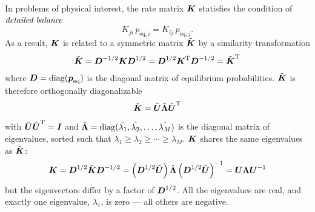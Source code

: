 In problems of physical interest, the rate matrix ${\mbox{\boldmath{$K$}}}$ statisfies the condition of $\emph{detailed balance}$
\begin{equation}
K_{ji} \, p_{\mathrm{eq},i}  = K_{ij} \, p_{\mathrm{eq},j} .
\end{equation}
As a result, ${\mbox{\boldmath{$K$}}}$ is related to a symmetric matrix $\tilde{{\mbox{\boldmath{$K$}}}}$ by a similarity transformation
\begin{eqnarray}
\tilde{{\mbox{\boldmath{$K$}}}} = {\mbox{\boldmath{$D$}}}^{-{1/2}} {\mbox{\boldmath{$K$}}} {\mbox{\boldmath{$D$}}}^{{1/2}} = {\mbox{\boldmath{$D$}}}^{{1/2}} {\mbox{\boldmath{$K$}}}^{\mathrm{T}} {\mbox{\boldmath{$D$}}}^{-{1/2}} = \tilde{{\mbox{\boldmath{$K$}}}}^{\mathrm{T}}
\end{eqnarray}
where ${\mbox{\boldmath{$D$}}} = \mathrm{diag}( {\mbox{\boldmath{$p$}}}_\mathrm{eq})$ is the diagonal matrix of equilibrium probabilities.  $\tilde{{\mbox{\boldmath{$K$}}}}$ is therefore orthogonally diagonalizable
\begin{equation}
\tilde{{\mbox{\boldmath{$K$}}}} = \tilde{{\mbox{\boldmath{$U$}}}} \tilde{{\mbox{\boldmath{$\Lambda$}}}} \tilde{{\mbox{\boldmath{$U$}}}}^\mathrm{T}
\end{equation}
with $\tilde{{\mbox{\boldmath{$U$}}}} \tilde{{\mbox{\boldmath{$U$}}}}^\mathrm{T} = {\mbox{\boldmath{$I$}}}$ and $\tilde{{\mbox{\boldmath{$\Lambda$}}}} = \mathrm{diag}(\tilde{\lambda_1}, \tilde{\lambda_2}, \ldots, \tilde{\lambda_M})$ is the diagonal matrix of eigenvalues, sorted such that $\lambda_1 \ge \lambda_2 \ge \cdots \ge \lambda_M$.  
${\mbox{\boldmath{$K$}}}$ shares the same eigenvalues as $\tilde{{\mbox{\boldmath{$K$}}}}$:
\begin{equation}
{\mbox{\boldmath{$K$}}} = {\mbox{\boldmath{$D$}}}^{1/2} \tilde{{\mbox{\boldmath{$K$}}}} {\mbox{\boldmath{$D$}}}^{-{1/2}} = \left( {\mbox{\boldmath{$D$}}}^{1/2} \tilde{{\mbox{\boldmath{$U$}}}} \right) \tilde{{\mbox{\boldmath{$\Lambda$}}}} \left( {\mbox{\boldmath{$D$}}}^{1/2} \tilde{{\mbox{\boldmath{$U$}}}} \right)^{-1} = {\mbox{\boldmath{$U$}}} {\mbox{\boldmath{$\Lambda$}}} {\mbox{\boldmath{$U$}}}^{-1}
\end{equation}
but the eigenvectors differ by a factor of ${\mbox{\boldmath{$D$}}}^{1/2}$.
All the eigenvalues are real, and exactly one eigenvalue, $\lambda_1$, is zero --- all others are negative.

